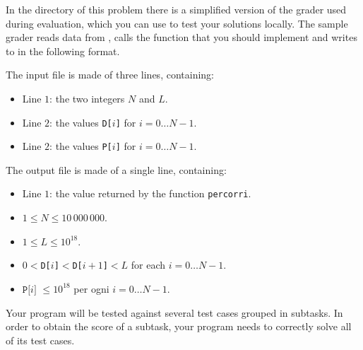 \Grader
In the directory of this problem there is a simplified version of the grader used during evaluation, which you can use to test your solutions locally. The sample grader reads data from , calls the function that you should implement and writes to \outputfile{} in the following format.

The input file is made of three lines, containing:
\begin{itemize}[nolistsep,itemsep=2mm]
\item Line $1$: the two integers $N$ and $L$.
\item Line $2$: the values \texttt{D[$i$]} for $i = 0\ldots N-1$.
\item Line $2$: the values \texttt{P[$i$]} for $i = 0\ldots N-1$.
\end{itemize}

The output file is made of a single line, containing:
\begin{itemize}[nolistsep,itemsep=2mm]
\item Line $1$: the value returned by the function \texttt{percorri}.
\end{itemize}



\Constraints

\begin{itemize}[nolistsep, itemsep=2mm]
	\item $1 \le N \le 10\,000\,000$.
	\item $1 \le L \le 10^{18}$.
	\item $0 < $\texttt{D[$i$]}$ < $\texttt{D[$i+1$]}$ < L$ for each $i=0\ldots N-1$.
	\item $\texttt{P[$i$]}$ $\le 10^{18}$ per ogni $i=0\ldots N-1$.
\end{itemize}


\pagebreak

\Scoring

Your program will be tested against several test cases grouped in subtasks.
In order to obtain the score of a subtask, your program needs to correctly solve all of its test cases.

